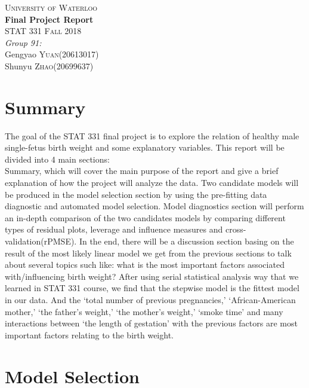 \documentclass[]{article}
\title{}
\author{}
\date{}
\begin{document}
\begin{titlepage}

\center
\textsc{\LARGE University of Waterloo}\\[5cm]
{ \huge \bfseries Final Project Report}\\[4cm]
     \textsc{\Large STAT 331 Fall 2018}\\[3cm]
     
\emph{Group 91:}\\[0.5cm]
Gengyao \textsc{Yuan}(20613017)\\[0.5cm]
Shunyu \textsc{Zhao}(20699637)


\end{titlepage}

\tableofcontents

\newpage

\section{Summary}

The goal of the STAT 331 final project is to explore the relation of
healthy male single-fetus birth weight and some explanatory variables.
This report will be divided into 4 main sections:\\
\newline
Summary, which will cover the main purpose of the report and give a
brief explanation of how the project will analyze the data. Two
candidate models will be produced in the model selection section by
using the pre-fitting data diagnostic and automated model selection.
Model diagnostics section will perform an in-depth comparison of the two
candidates models by comparing different types of residual plots,
leverage and influence measures and cross-validation(rPMSE). In the end,
there will be a discussion section basing on the result of the most
likely linear model we get from the previous sections to talk about
several topics such like: what is the most important factors associated
with/influencing birth weight? \newline
After using serial statistical analysis way that we learned in STAT 331
course, we find that the stepwise model is the fittest model in our
data. And the `total number of previous pregnancies,' `African-American
mother,' `the father's weight,' `the mother's weight,' `smoke time' and
many interactions between `the length of gestation' with the previous
factors are most important factors relating to the birth weight.

\section{Model Selection}
\end{document}

